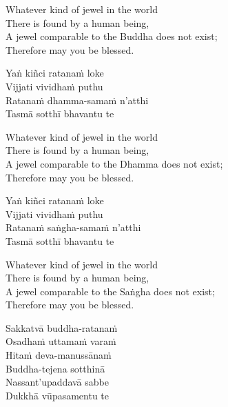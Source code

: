 \begin{english-verses}
  Whatever kind of jewel in the world\\
  There is found by a human being,\\
  A jewel comparable to the Buddha does not exist;\\
  Therefore may you be blessed.
\end{english-verses}

\begin{pali-hang-continued}
  Yaṅ kiñci ratanaṁ loke\\
  Vijjati vividhaṁ puthu\\
  Ratanaṁ dhamma-samaṁ n'atthi\\
  Tasmā sotthī bhavantu te
\end{pali-hang-continued}

\begin{english-verses}
  Whatever kind of jewel in the world\\
  There is found by a human being,\\
  A jewel comparable to the Dhamma does not exist;\\
  Therefore may you be blessed.
\end{english-verses}

\begin{pali-hang-continued}
  Yaṅ kiñci ratanaṁ loke\\
  Vijjati vividhaṁ puthu\\
  Ratanaṁ saṅgha-samaṁ n'atthi\\
  Tasmā sotthī bhavantu te
\end{pali-hang-continued}

\begin{english-verses}
  Whatever kind of jewel in the world\\
  There is found by a human being,\\
  A jewel comparable to the Saṅgha does not exist;\\
  Therefore may you be blessed.
\end{english-verses}

\begin{pali-hang-continued}
  Sakkatvā buddha-ratanaṁ\\
  Osadhaṁ\makeatletter\hyperlink{endnote127-appendix}\makeatother
  uttamaṁ varaṁ\\
  Hitaṁ deva-manussānaṁ\\
  Buddha-tejena sotthinā\\
  Nassant'upaddavā sabbe\\
  Dukkhā vūpasamentu te
\end{pali-hang-continued}

